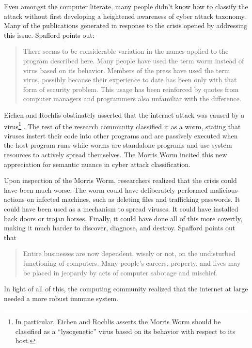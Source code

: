 Even amongst the computer literate, many people didn't know how to classify
the attack without first developing a heightened awareness of cyber attack
taxonomy. Many of the publications generated in response to the crisis opened 
by addressing this issue. Spafford\cite{spafford_internet_1989-1} points out:
\begin{quote}
There seems to be considerable variation in the names applied to the program
described here. Many people have used the term worm instead of virus based on its
behavior. Members of the press have used the term virus, possibly because their 
experience  to date has been only with that form of security problem. This usage
has been reinforced by quotes from computer managers and programmers also
unfamiliar with the difference.
\end{quote}
Eichen and Rochlis\cite{eichin_microscope_1989} obstinately asserted that the
internet attack was caused by a virus\footnote{In particular,
Eichen and Rochlis\cite{eichin_microscope_1989} asserts the Morris Worm should
be classified as a ``lysogenetic'' virus based on its behavior with respect to
its host.} . The rest of the research community classified it as a worm,
stating that viruses instert their code into other programs and are passively
executed when the host program runs while worms are standalone programs and use
system resources to actively spread
themselves\cite{seeley_tour_1989}\cite{spafford_internet_1989}\cite{spafford_internet_1989-1}.
The Morris Worm incited this new appreciation for semantic nuance in cyber attack classification.

Upon inspection of the Morris Worm, researchers realized that the crisis could 
have been much worse. The worm could have deliberately performed malicious
actions on infected machines, such as deleting files and trafficking passwords.
It could have been used as a mechanism to spread viruses. It could have installed
back doors or trojan horses. Finally, it could have done all of this more
covertly, making it much harder to discover, diagnose, and destroy.
Spafford\cite{spafford_crisis_1989} points out that
\begin{quote}
Entire businesses are now dependent, wisely or not, on the undisturbed
functioning of computers. Many people's careers, property, and lives may be
placed in jeopardy by acts of computer sabotage and mischief.
\end{quote} 

In light of all of this, the computing community realized that the internet at
large needed a more robust immune system.
           	
